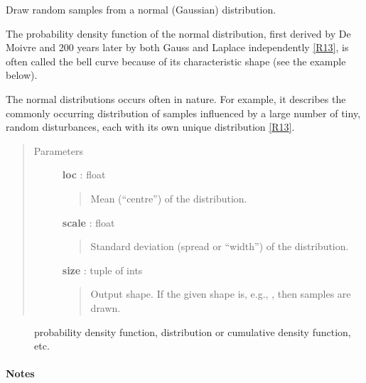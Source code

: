 \documentclass[letterpaper,10pt,english]{sphinxmanual}
\begin{document}
\begin{fulllineitems}
\label{index:halla.hierarchy.normal}
Draw random samples from a normal (Gaussian) distribution.

The probability density function of the normal distribution, first
derived by De Moivre and 200 years later by both Gauss and Laplace
independently {\hyperref[index:r13]{{[}R13{]}}}, is often called the bell curve because of
its characteristic shape (see the example below).

The normal distributions occurs often in nature.  For example, it
describes the commonly occurring distribution of samples influenced
by a large number of tiny, random disturbances, each with its own
unique distribution {\hyperref[index:r13]{{[}R13{]}}}.
\begin{quote}\begin{description}
\item[{Parameters}] \leavevmode
\textbf{loc} : float
\begin{quote}

Mean (``centre'') of the distribution.
\end{quote}

\textbf{scale} : float
\begin{quote}

Standard deviation (spread or ``width'') of the distribution.
\end{quote}

\textbf{size} : tuple of ints
\begin{quote}

Output shape.  If the given shape is, e.g., , then
 samples are drawn.
\end{quote}

\end{description}\end{quote}



\begin{description}
\item[{}] \leavevmode
probability density function, distribution or cumulative density function, etc.

\end{description}


\paragraph{Notes}


\end{fulllineitems}
\end{document}
